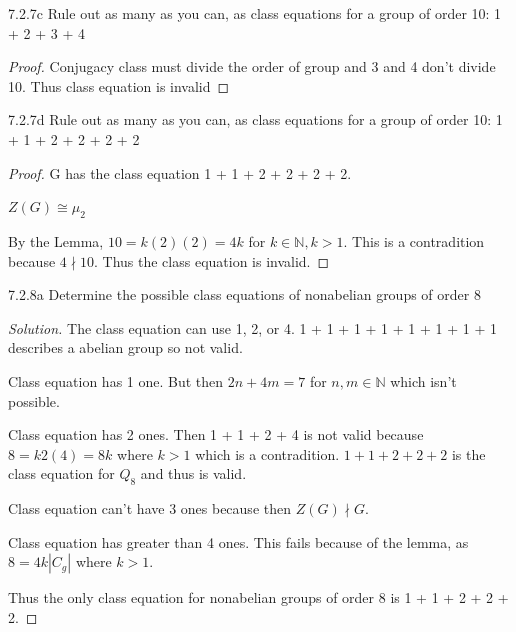 \documentclass{article}
\newcommand{\N}{\mathbb{N}}
\newenvironment{solution}
{\renewcommand\qedsymbol{$\blacksquare$}\begin{proof}[Solution]}
{\end{proof}}
\begin{document}
\begin{PROB}{7.2.7c}\label{Problem 7.2.7c.}
    Rule out as many as you can, as class equations for a group of order 10:
    1 + 2 + 3 + 4
\end{PROB}
\begin{proof}
    Conjugacy class must divide the order of group and 3 and 4 don't divide 10. Thus class equation is invalid
\end{proof}

\begin{PROB}{7.2.7d}\label{Problem 7.2.7d.}
    Rule out as many as you can, as class equations for a group of order 10:
    1 + 1 + 2 + 2 + 2 + 2
\end{PROB}
\begin{proof}

    G has the class equation 1 + 1 + 2 + 2 + 2 + 2.

    $Z(G) \cong \mu_2$

    By the Lemma, $10 = k(2)(2) = 4k$ for $k \in \N, k > 1$. This is a contradition because $4 \nmid 10$. Thus the class equation is invalid. 




    
    
\end{proof}

\bigskip

\begin{PROB}{7.2.8a}\label{Problem 7.2.8a.}
    Determine the possible class equations of nonabelian groups of order 8
\end{PROB}
\begin{solution}
    The class equation can use 1, 2, or 4. 1 + 1 + 1 + 1 + 1 + 1 + 1 + 1 describes a abelian group so not valid. 

    Class equation has 1 one. But then $2n + 4m = 7$ for $n, m \in \N$ which isn't possible.

    Class equation has 2 ones. Then 1 + 1 + 2 + 4 is not valid because $8 = k2(4) = 8k$ where $k > 1$ which is a contradition. $1 + 1 + 2 + 2 + 2$ is the class equation for $Q_8$ and thus is valid.
    
    Class equation can't have 3 ones because then $Z(G) \nmid G$.

    Class equation has greater than 4 ones. This fails because of the lemma, as $8 = 4k|C_g|$ where $k > 1$.

    Thus the only class equation for nonabelian groups of order 8 is 1 + 1 + 2 + 2 + 2.
\end{solution}
\end{document}
